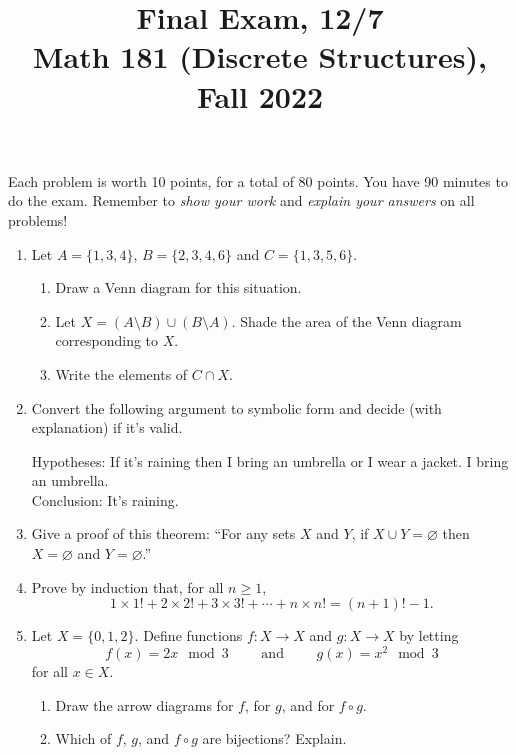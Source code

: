 \documentclass[11pt]{article}
\title{Final Exam, 12/7 \\Math 181 (Discrete Structures), Fall 2022}
\date{}
\begin{document}
\maketitle

\thispagestyle{empty}

\vspace{-1.5cm}

Each problem is worth 10 points, for a total of 80 points. You have 90 minutes to do the exam. Remember to \emph{show your work} and \emph{explain your answers} on all problems!

\begin{enumerate}

\item Let $A=\{1,3,4\}$, $B= \{2,3,4,6\}$ and $C = \{1,3,5,6\}$.
\begin{enumerate}
\item Draw a Venn diagram for this situation.
\item Let $X = (A \setminus B) \cup (B \setminus A)$. Shade the area of the Venn diagram corresponding to $X$.
\item Write the elements of $C \cap X$.
\end{enumerate}

\item Convert the following argument to symbolic form and decide (with explanation) if it's valid. 
\smallskip

Hypotheses: If it's raining then I bring an umbrella or I wear a jacket. I bring an umbrella. \\ Conclusion: It's raining.
\item Give a proof of this theorem: ``For any sets $X$ and $Y$, if $X \cup Y = \varnothing$ then $X= \varnothing$ and $Y=\varnothing$.''

\item Prove by induction that, for all $n \geq 1$,
\[ 1\times 1! + 2 \times 2! + 3 \times 3! + \cdots + n \times n! = (n+1)! - 1.\]

\item Let $X = \{0,1,2\}$. Define functions $f\colon X \to X$ and $g\colon X \to X$ by letting
\[ f(x) = 2x \mod 3 \qquad \textrm{ and } \qquad g(x) = x^2 \mod 3\]
for all $x \in X$.
\begin{enumerate}
\item Draw the arrow diagrams for $f$, for $g$, and for $f\circ g$.
\item Which of $f$, $g$, and $f\circ g$ are bijections? Explain.
\end{enumerate}


\end{enumerate}
\end{document}
